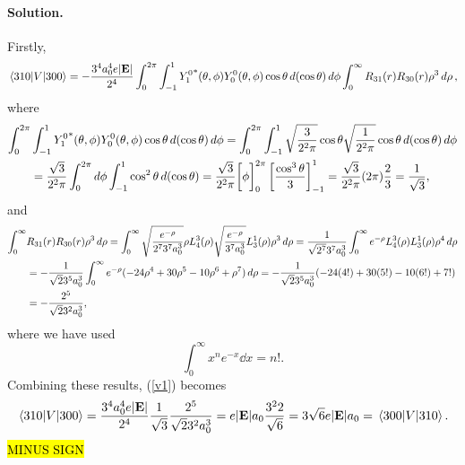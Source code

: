 \documentclass[11pt]{article}
\newcommand{\refeq}[1]{(\ref{#1})}
\newcommand{\beq}{\begin{equation*}}
\newcommand{\eeq}{\end{equation*}}
\newcommand{\beqn}{\begin{equation}}
\newcommand{\eeqn}{\end{equation}}
\newenvironment{solution}
{
    \paragraph{Solution.}
    \ignorespaces
}
{
}
\begin{document}
\begin{solution}
	Firstly,
	\beqn \label{v1}
		\mel{3 1 0}{V}{3 0 0} = -\frac{3^4 \ao^4 e |\vE|}{2^4} \int_0^{2\pi} \int_{-1}^1 {Y_1^0}^*(\tht, \phi) Y_0^0(\tht, \phi) \cos\tht \dcost \dphi \int_0^\infty R_{3 1}(r) R_{3 0}(r) \rho^3 \drho,
	\eeqn
	where
	\begin{align*}
		\int_0^{2\pi} &\int_{-1}^1 {Y_1^0}^*(\theta, \phi) Y_0^0(\theta, \phi) \cos\theta \dd{(\cos\theta)} \dd{\phi}
		= \int_0^{2\pi} \int_{-1}^1 \sqrt{\frac{3}{2^2 \pi}} \cos\theta \sqrt{\frac{1}{2^2 \pi}} \cos\theta \dd{(\cos\theta)} \dd{\phi} \\
		&= \frac{\sqrt{3}}{2^2 \pi} \int_0^{2\pi} \dd{\phi} \int_{-1}^1 \cos^2\theta \dd{(\cos\theta)}
		= \frac{\sqrt{3}}{2^2 \pi} \bigg[ \phi \bigg]_0^{2\pi} \left[ \frac{\cos^3\theta}{3} \right]_{-1}^1
		= \frac{\sqrt{3}}{2^2 \pi} (2 \pi) \frac{2}{3}
		= \frac{1}{\sqrt{3}},
	\end{align*}
	and
	\begin{align*}
		\int_0^\infty &R_{3 1}(r) R_{3 0}(r) \rho^3 \dd{\rho}
		= \int_0^\infty \sqrt{\frac{e^{-\rho}}{2^7 3^7 a_0^3}} \rho L_4^3(\rho) \sqrt{\frac{e^{-\rho}}{3^7 a_0^3}} L_3^1(\rho) \rho^3 \dd{\rho}
		= \frac{1}{\sqrt{2^7} 3^7 a_0^3} \int_0^\infty e^{-\rho} L_4^3(\rho) L_3^1(\rho) \rho^4 \dd{\rho} \\
		&= -\frac{1}{\sqrt{2} 3^5 a_0^3} \int_0^\infty e^{-\rho} (-24 \rho^4 + 30 \rho^5 - 10 \rho^6 + \rho^7) \dd{\rho}
		= -\frac{1}{\sqrt{2} 3^5 a_0^3} (-24 (4!) + 30 (5!) - 10 (6!) + 7!) \\
		&= -\frac{2^5}{\sqrt{2} 3^2 a_0^3},
	\end{align*}
	where we have used
	\beq
		\int_0^\infty x^n e^{-x} \dd{x} = n!.
	\eeq
	Combining these results, \refeq{v1} becomes
	\beq
		\mel{3 1 0}{V}{3 0 0} = \frac{3^4 \ao^4 e |\vE|}{2^4} \frac{1}{\sqrt{3}} \frac{2^5}{\sqrt{2} 3^2 \ao^3}
		= e |\vE| \ao \frac{3^2 2}{\sqrt{6}}
		= 3 \sqrt{6} e |\vE| \ao
		= \mel{3 0 0}{V}{3 1 0}.
	\eeq
	\hl{MINUS SIGN}
	

\end{solution}
\end{document}
